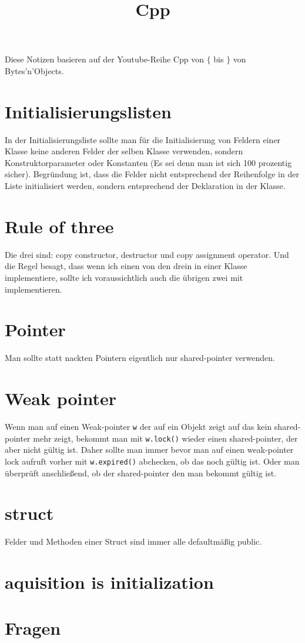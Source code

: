 \documentclass[paper=a4,10pt]{scrartcl}
\begin{document}
\title{Cpp}
Diese Notizen basieren auf der Youtube-Reihe Cpp von $\{$ bis $\}$ von Bytes'n'Objects. 


\section{Initialisierungslisten}
In der Initialisierungsliste sollte man für die Initialisierung von Feldern einer Klasse keine anderen Felder der selben Klasse verwenden, sondern Konstruktorparameter oder Konstanten (Es sei denn man ist sich 100 prozentig sicher). Begründung ist, dass die Felder nicht entsprechend der Reihenfolge in der Liste initialisiert werden, sondern entsprechend der Deklaration in der Klasse.

\section{Rule of three}
Die drei sind: copy constructor, destructor und copy assignment operator. Und die Regel besagt, dass wenn ich einen von den drein in einer Klasse implementiere, sollte ich voraussichtlich auch die übrigen zwei mit implementieren.

\section{Pointer}
Man sollte statt nackten Pointern eigentlich nur shared-pointer verwenden.

\section{Weak pointer}
Wenn man auf einen Weak-pointer \texttt{w} der auf ein Objekt zeigt auf das kein shared-pointer mehr zeigt, bekommt man mit \texttt{w.lock()} wieder einen shared-pointer, der aber nicht gültig ist. Daher sollte man immer bevor man auf einen weak-pointer lock aufruft vorher mit \texttt{w.expired()} abchecken, ob das noch gültig ist. Oder man überprüft anschließend, ob der shared-pointer den man bekommt gültig ist. 

\section{struct}
Felder und Methoden einer Struct sind immer alle defaultmäßig public.

\section{aquisition is initialization}



\section{Fragen}
\end{document}
